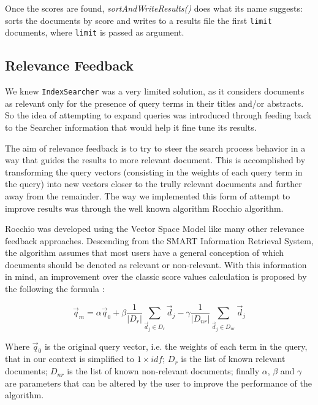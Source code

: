 \documentclass[12pt]{article}
\begin{document}
Once the scores are found, \textit{sortAndWriteResults()} does what its name 
suggests: sorts the documents by score and writes to a results file the first 
\texttt{limit} documents, where \texttt{limit} is passed as argument.

\subsection{Relevance Feedback}\label{rocchio}

We knew \texttt{IndexSearcher} was a very limited solution, as it considers 
documents as relevant only for the presence of query terms in their titles 
and/or abstracts.
So the idea of attempting to expand queries was introduced through feeding back
to the Searcher information that would help it fine tune its results.

The aim of relevance feedback is to try to steer the search process behavior 
in a way that guides the results to more relevant document.
This is accomplished by transforming the query vectors (consisting in the weights 
of each query term in the query) into new vectors closer to the trully
relevant documents and further away from the remainder.
The way we implemented this form of attempt to improve results was through the
well known algorithm Rocchio algorithm.

Rocchio was developed using the Vector Space Model like many other relevance 
feedback approaches. 
Descending from the SMART Information Retrieval System, the algorithm assumes 
that most users have a general conception of which documents should be denoted 
as relevant or non-relevant. 
With this information in mind, an improvement over the classic score values 
calculation is proposed by the following the formula \cite{rocchio}:

\vspace{-10pt}
\begin{equation}
  \vec{q}_{m} = \alpha\vec{q}_{0} + \beta\frac{1}{|D_{r}|} \sum_{ \vec{d}_{j} \in D_{r}} \vec{d}_{j} - \gamma\frac{1}{|D_{nr}|} \sum_{ \vec{d}_{j} \in D_{nr}} \vec{d}_{j}
\end{equation}
 
Where $\vec{q}_{0}$ is the original query vector, i.e. the weights of each term 
in the query, that in our context is simplified to $1 \times idf$; 
$D_{r}$ is the list of known relevant documents;
$D_{nr}$ is the list of known non-relevant documents; 
finally $\alpha$, $\beta$ and $\gamma$ are parameters that can be altered by the 
user to improve the performance of the algorithm. 
\end{document}
